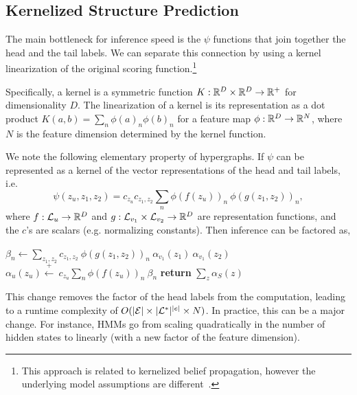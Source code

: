 \documentclass{article}
\begin{document}
\subsection{Kernelized Structure Prediction}

The main bottleneck for inference speed is the $\psi$ functions that join together the head and the tail labels. 
We can separate this connection by using a kernel linearization \cite{aizerman67linearization,jakel2007linearization}
of the original scoring function.\footnote{
This approach is related to kernelized belief propagation,
however the underlying model assumptions are different~\citep{song2011kernelbp}.
}

Specifically, a kernel is a symmetric function
$K : {\mathbb{R}^D} \times {\mathbb{R}^D} \to \mathbb{R}^+$ for dimensionality $D$.
The linearization of a kernel is its representation as a dot product $K(a, b) = \sum_n \phi(a)_n  \phi(b)_n$ for a feature map $\phi : {\mathbb{R}^D} \to \mathbb{R}^N$, where $N$ is the feature
dimension determined by the kernel function.

We note the following elementary property of hypergraphs. If $\psi$
can be represented as a kernel of the vector representations of the head and tail labels, 
i.e.
\[\psi(z_u, z_1, z_2) =c_{z_u} c_{z_1, z_2} \sum_n \phi(f(z_u))_n \ \phi(g(z_{1}, z_{2}))_n,  \]
where $f : {\cal L}_u \to \mathbb{R}^D $ and $g : {\cal L}_{v_1} \times {\cal L}_{v_2} \to \mathbb{R}^D$ are representation functions, and the $c$'s are scalars (e.g. normalizing constants). Then inference can be factored as, 
\begin{algorithm}
\begin{algorithmic} 
\STATE $\beta_n \gets \displaystyle \sum_{z_1, z_2} c_{z_1, z_2}\  \phi(g(z_{1}, z_{2}))_n \  \alpha_{v_1}(z_1) \  \alpha_{v_1}(z_2)$
\STATE $\alpha_u(z_u) \stackrel{+}{\gets} \displaystyle \  c_{z_u} \sum_n \phi(f(z_u))_n\ \beta_n$
\ENDFOR
\ENDFOR
\STATE \textbf{return} $\sum_z \alpha_S(z)$
\end{algorithmic} 
\end{algorithm}


This change removes the factor of the head labels from the
computation, leading to a runtime complexity of
$O(|{\cal E}|\times |{\cal L}^*|^{|e|}\times N)$.  In practice, this
can be a major change. For instance, HMMs go from scaling quadratically
in the number of hidden states to linearly (with a new factor of the
feature dimension).


\end{document}
